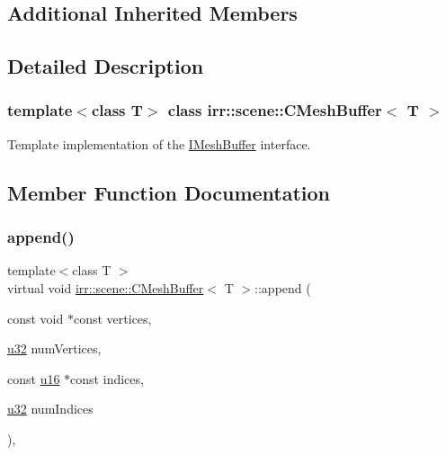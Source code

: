 \subsection*{Additional Inherited Members}


\subsection{Detailed Description}
\subsubsection*{template$<$class T$>$\newline
class irr\+::scene\+::\+C\+Mesh\+Buffer$<$ T $>$}

Template implementation of the \hyperlink{classirr_1_1scene_1_1IMeshBuffer}{I\+Mesh\+Buffer} interface. 

\subsection{Member Function Documentation}
\mbox{\label{classirr_1_1scene_1_1CMeshBuffer_a7efd85cba5d5d86bee8c2ea2fe0524d9}} 
\subsubsection{\texorpdfstring{append()}{append()}\hspace{0.1cm}{\footnotesize\ttfamily [1/2]}}
{\footnotesize\ttfamily template$<$class T $>$ \\
virtual void \hyperlink{classirr_1_1scene_1_1CMeshBuffer}{irr\+::scene\+::\+C\+Mesh\+Buffer}$<$ T $>$\+::append (\begin{DoxyParamCaption}\item[{const void $\ast$const}]{vertices,  }\item[{\hyperlink{namespaceirr_a0416a53257075833e7002efd0a18e804}{u32}}]{num\+Vertices,  }\item[{const \hyperlink{namespaceirr_ae9f8ec82692ad3b83c21f555bfa70bcc}{u16} $\ast$const}]{indices,  }\item[{\hyperlink{namespaceirr_a0416a53257075833e7002efd0a18e804}{u32}}]{num\+Indices }\end{DoxyParamCaption})\hspace{0.3cm}{\ttfamily [inline]}, {\ttfamily [virtual]}}



